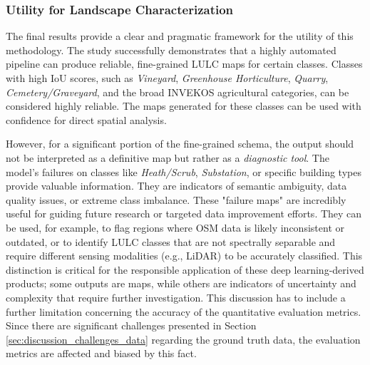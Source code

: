 \documentclass{report}
\begin{document}
\subsubsection{Utility for Landscape Characterization}
The final results provide a clear and pragmatic framework for the utility of this methodology. The study successfully demonstrates that a highly automated pipeline can produce reliable, fine-grained LULC maps for certain classes. Classes with high IoU scores, such as \textit{Vineyard}, \textit{Greenhouse Horticulture}, \textit{Quarry}, \textit{Cemetery/Graveyard}, and the broad INVEKOS agricultural categories, can be considered highly reliable. The maps generated for these classes can be used with confidence for direct spatial analysis. \par
However, for a significant portion of the fine-grained schema, the output should not be interpreted as a definitive map but rather as a \textit{diagnostic tool}. The model's failures on classes like \textit{Heath/Scrub}, \textit{Substation}, or specific building types provide valuable information. They are indicators of semantic ambiguity, data quality issues, or extreme class imbalance. These "failure maps" are incredibly useful for guiding future research or targeted data improvement efforts. They can be used, for example, to flag regions where OSM data is likely inconsistent or outdated, or to identify LULC classes that are not spectrally separable and require different sensing modalities (e.g., LiDAR) to be accurately classified. This distinction is critical for the responsible application of these deep learning-derived products; some outputs are maps, while others are indicators of uncertainty and complexity that require further investigation.
This discussion has to include a further limitation concerning the accuracy of the quantitative evaluation metrics. Since there are significant challenges presented in Section \ref{sec:discussion_challenges_data} regarding the ground truth data, the evaluation metrics are affected and biased by this fact. 
\end{document}
